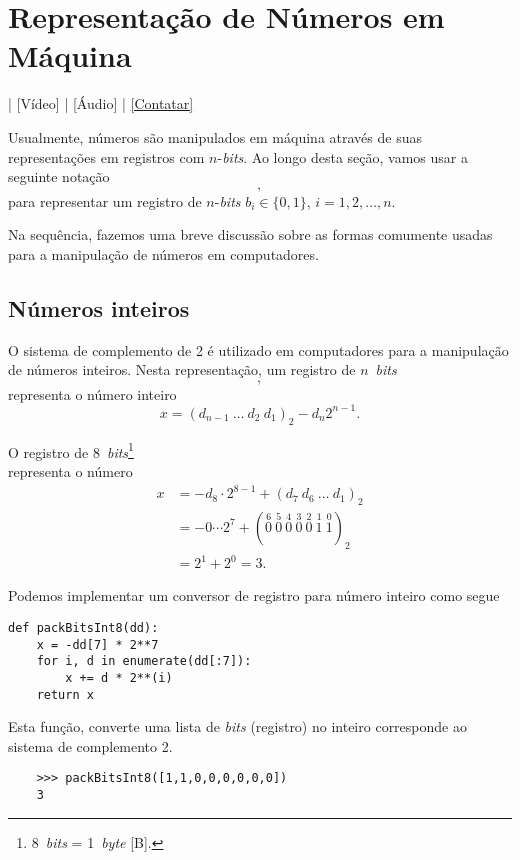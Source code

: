 \section{Representação de Números em Máquina}\label{cap_artm_sec_repummaq}

\begin{flushright}
  [YouTube] | [Vídeo] | [Áudio] | \href{https://phkonzen.github.io/notas/contato.html}{[Contatar]}
\end{flushright}

Usualmente, números são manipulados em máquina através de suas representações em registros com $n$-{\it bits}. Ao longo desta seção, vamos usar a seguinte notação
\begin{equation}
  [b_1 ~ b_2 ~ b_3 ~ \cdots ~ b_n],
\end{equation}
para representar um registro de $n$-{\it bits} $b_i\in\{0, 1\}$, $i=1, 2, \dotsc, n$.

Na sequência, fazemos uma breve discussão sobre as formas comumente usadas para a manipulação de números em computadores.

\subsection{Números inteiros}

O sistema de complemento de 2 é utilizado em computadores para a manipulação de números inteiros. Nesta representação, um registro de $n$~{\it bits}
\begin{equation}
  [d_1 ~ d_2 ~ d_3 ~ \cdots ~ d_n],
\end{equation}
representa o número inteiro
\begin{equation}
  x = (d_{n-1}~\ldots~d_2~d_1)_2 - d_n2^{n-1}.
\end{equation}

\begin{ex}
  O registro de 8~{\it bits}\footnote{8~{\it bits} = 1~{\it byte} [B].}
  \begin{equation}
    [1 ~ 1 ~ 0 ~ 0 ~ 0 ~ 0 ~ 0 ~ 0]
  \end{equation}
  representa o número
  \begin{align}
    x &= -d_8\cdot 2^{8-1} + (d_7~d_6~\ldots~d_1)_2\\
      &= -0\cdots 2^{7} + (\stackrel{6}{0}~\stackrel{5}{0}~\stackrel{4}{0}~\stackrel{3}{0}~\stackrel{2}{0}~\stackrel{1}{1}~\stackrel{0}{1})_2\\
      &= 2^1 + 2^0 = 3.
  \end{align}
  
  Podemos implementar um conversor de registro para número inteiro como segue
  \begin{lstlisting}[caption=packbits8.py, label=cod:packbits8]
    def packBitsInt8(dd):
    x = -dd[7] * 2**7
    for i, d in enumerate(dd[:7]):
        x += d * 2**(i)
    return x
  \end{lstlisting}
  Esta função, converte uma lista de {\it bits} (registro) no inteiro corresponde ao sistema de complemento 2.
  \begin{lstlisting}
    >>> packBitsInt8([1,1,0,0,0,0,0,0])
    3
  \end{lstlisting}
\end{ex}

